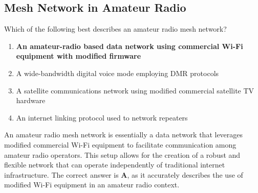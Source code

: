 \subsection{Mesh Network in Amateur Radio}
\label{T8D12}

\begin{tcolorbox}[colback=gray!10!white,colframe=black!75!black,title=T8D12]
Which of the following best describes an amateur radio mesh network?
\begin{enumerate}[noitemsep]
    \item \textbf{An amateur-radio based data network using commercial Wi-Fi equipment with modified firmware}
    \item A wide-bandwidth digital voice mode employing DMR protocols
    \item A satellite communications network using modified commercial satellite TV hardware
    \item An internet linking protocol used to network repeaters
\end{enumerate}
\end{tcolorbox}

An amateur radio mesh network is essentially a data network that leverages modified commercial Wi-Fi equipment to facilitate communication among amateur radio operators. This setup allows for the creation of a robust and flexible network that can operate independently of traditional internet infrastructure. The correct answer is \textbf{A}, as it accurately describes the use of modified Wi-Fi equipment in an amateur radio context.